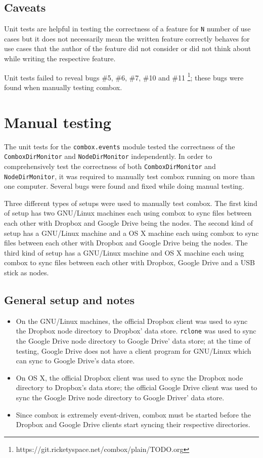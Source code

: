 \subsection{Caveats}

Unit tests are helpful in testing the correctness of a feature for
\verb+N+ number of use cases but it does not necessarily mean the
written feature correctly behaves for use cases that the author of the
feature did not consider or did not think about while writing the
respective feature.

Unit tests failed to reveal bugs \#5, \#6, \#7, \#10 and \#11
\footnote{https://git.ricketyspace.net/combox/plain/TODO.org}; these
bugs were found when manually testing combox.

\section{Manual testing}\label{sec:4-manual-testing}

The unit tests for the \verb+combox.events+ module tested the
correctness of the \\ \verb+ComboxDirMonitor+ and
\verb+NodeDirMonitor+ independently. In order to comprehensively test
the correctness of both \verb+ComboxDirMonitor+ and
\verb+NodeDirMonitor+, it was required to manually test combox running
on more than one computer. Several bugs were found and fixed while
doing manual testing.

Three different types of setups were used to manually test combox. The
first kind of setup has two GNU/Linux machines each using combox to
sync files between each other with Dropbox and Google Drive being the
nodes. The second kind of setup has a GNU/Linux machine and a OS X
machine each using combox to sync files between each other with
Dropbox and Google Drive being the nodes. The third kind of setup has
a GNU/Linux machine and OS X machine each using combox to sync files
between each other with Dropbox, Google Drive and a USB stick as
nodes.

\subsection{General setup and notes}

\begin{itemize}
\item On the GNU/Linux machines, the official Dropbox client was used
  to sync the Dropbox node directory to Dropbox' data
  store. \verb+rclone+ \cite{program:rclone} was used to sync the
  Google Drive node directory to Google Drive' data store; at the time
  of testing, Google Drive does not have a client program for
  GNU/Linux which can sync to Google Drive's data store.
\item On OS X, the official Dropbox client was used to sync the
  Dropbox node directory to Dropbox's data store; the official Google
  Drive client was used to sync the Google Drive node directory to
  Google Driver' data store.
\item Since combox is extremely event-driven, combox must be started
  before the Dropbox and Google Drive clients start syncing their
  respective directories.
\end{itemize}

